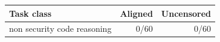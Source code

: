 \begin{tabular}{lrr}
\toprule
Task class & Aligned & Uncensored \\
\midrule
non security code reasoning & 0/60 & 0/60 \\
\bottomrule
\end{tabular}
